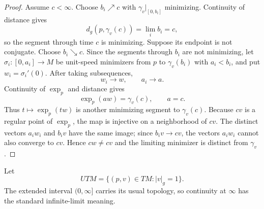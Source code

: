 \begin{proposition}
\begin{proof}
Assume $c<\infty$. Choose $b_i\nearrow c$ with
$\gamma_v|_{[0,b_i]}$ minimizing. Continuity of distance gives
\[
d_g(p,\gamma_v(c))=\lim_i b_i=c,
\]
so the segment through time $c$ is minimizing. Suppose its endpoint is not
conjugate. Choose $b_i\searrow c$. Since the segments through $b_i$ are not
minimizing, let
$\sigma_i\colon[0,a_i]\to M$ be unit-speed minimizers from $p$ to
$\gamma_v(b_i)$ with $a_i<b_i$, and put $w_i=\sigma_i'(0)$. After taking
subsequences,
\[
w_i\to w,
\qquad a_i\to a.
\]
Continuity of $\exp_p$ and distance gives
\[
\exp_p(aw)=\gamma_v(c),
\qquad a=c.
\]
Thus $t\mapsto\exp_p(tw)$ is another minimizing segment to $\gamma_v(c)$.
Because $cv$ is a regular point of $\exp_p$, the map is injective on a
neighborhood of $cv$. The distinct vectors $a_iw_i$ and $b_iv$ have the same
image; since $b_iv\to cv$, the vectors $a_iw_i$ cannot also converge to $cv$.
Hence $cw\ne cv$ and the limiting minimizer is distinct from $\gamma_v$.
\end{proof}
\end{proposition}

Let
\[
UTM=\{(p,v)\in TM:|v|_g=1\}.
\]
The extended interval $(0,\infty]$ carries its usual topology, so continuity at
$\infty$ has the standard infinite-limit meaning.

